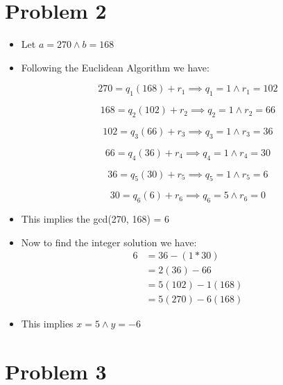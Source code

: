 \documentclass[]{report}
\begin{document}
	\begin{flushright}
		\smiley{}
	\end{flushright}
	
\section{Problem 2}

	\begin{itemize}
		\item Let $ a = 270 \land b = 168 $
		
		\item Following the Euclidean Algorithm we have:
		
		$$ 270 = q_{1}(168) + r_1  \implies q_1 = 1 \land r_1 = 102 $$ 
		
		$$ 168 = q_{2}(102) + r_2 \implies q_2 = 1 \land r_2 = 66 $$
		
		$$ 102 = q_3(66) + r_3 \implies q_3 = 1 \land r_3 = 36 $$
		
		$$ 66 = q_4(36) + r_4 \implies q_4 = 1 \land r_4 = 30 $$
		
		$$ 36 = q_5(30) + r_5 \implies q_5 = 1 \land r_5 = 6 $$
		
		$$  30 = q_6(6) + r_6 \implies q_6 = 5 \land r_6  = 0 $$
		
		
		\item This implies the gcd(270, 168) = 6
		
		\item Now to find the integer solution we have:
		\begin{align*}
		 6 &= 36 - (1 * 30)  \\
		 &= 2(36) - 66  \\		
		 &= 5(102) - 1(168)  \\
		  &= 5(270) - 6(168) 
	\end{align*}
		\item This implies $ x = 5 \land y = -6 $ 
		
	\end{itemize}
	
	
	\begin{flushright}
		\smiley{}
	\end{flushright}
	
	
	
\section{Problem 3}
\end{document}
